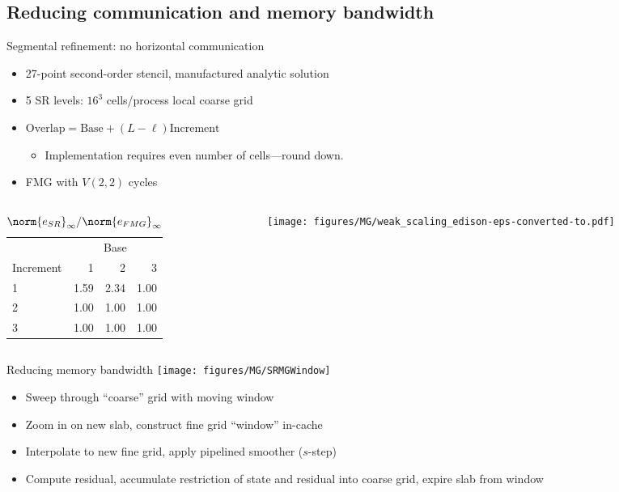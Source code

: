 \documentclass{beamer}
\begin{document}
\subsection{Reducing communication and memory bandwidth}

\begin{frame}{Segmental refinement: no horizontal communication}
  \begin{itemize}
  \item 27-point second-order stencil, manufactured analytic solution
  \item 5 SR levels: $16^3$ cells/process local coarse grid
  \item $\text{Overlap} = \text{Base} + (L-\ell) \text{Increment}$
    \begin{itemize}
    \item Implementation requires even number of cells---round down.
    \end{itemize}
  \item FMG with $V(2,2)$ cycles
  \end{itemize}
  \begin{columns}
    \begin{column}{0.4\textwidth}
      \begin{table}\small
        \centering\caption{$\norm{e_{SR}}_\infty / \norm{e_{FMG}}_\infty$}\label{tab:sr-error}
        \begin{tabular}{l rrr}
          \toprule
          & \multicolumn{3}{c}{Base} \\
          Increment & 1 & 2 & 3 \\
          \midrule
          1 & {\color{red} 1.59} & {\color{red} 2.34} & 1.00 \\
          2 & 1.00 & 1.00 & 1.00 \\
          3 & 1.00 & 1.00 & 1.00 \\
          \bottomrule
        \end{tabular}
      \end{table}
    \end{column}
    \begin{column}{0.6\textwidth}
      \texttt{[image: figures/MG/weak\_scaling\_edison-eps-converted-to.pdf]}
    \end{column}
  \end{columns}
\end{frame}

\begin{frame}{Reducing memory bandwidth}
  \texttt{[image: figures/MG/SRMGWindow]}
  \begin{itemize}
  \item Sweep through ``coarse'' grid with moving window
  \item Zoom in on new slab, construct fine grid ``window'' in-cache
  \item Interpolate to new fine grid, apply pipelined smoother ($s$-step)
  \item Compute residual, accumulate restriction of state and residual into coarse grid, expire slab from window
  \end{itemize}
\end{frame}
\end{document}
